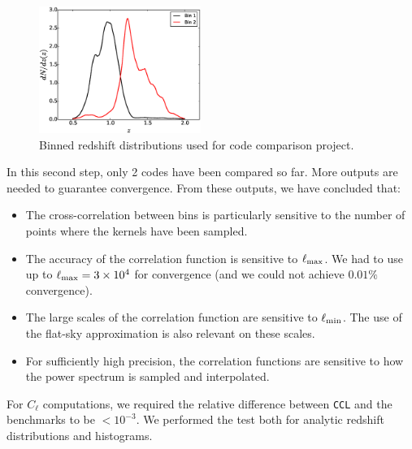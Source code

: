 \documentclass[\docopts]{\docclass}
\newcommand{\ccl}{{\tt CCL}\xspace}
\begin{document}
\begin{figure}
\centering
\includegraphics[width=0.47\textwidth]{zdist.eps}
\caption{Binned redshift distributions used for code comparison project.}
\label{fig:zhistos}
\end{figure}

In this second step, only 2 codes have been compared so far. More outputs are needed to guarantee convergence. From these outputs, we have concluded that:
\begin{itemize}
\item The cross-correlation between bins is particularly sensitive to the number of points where the kernels have been sampled.
\item The accuracy of the correlation function is sensitive to $\ell_{\rm max}$. We had to use up to $\ell_{\rm max}=3\times10^4$ for convergence (and we could not achieve $0.01\%$ convergence).
\item The large scales of the correlation function are sensitive to $\ell_{\rm min}$. The use of the flat-sky approximation is also relevant on these scales.
\item For sufficiently high precision, the correlation functions are sensitive to how the power spectrum is sampled and interpolated.
\end{itemize}

For $C_\ell$ computations, we required the relative difference between \ccl and the benchmarks to be $<10^{-3}$. We performed the test both for analytic redshift distributions and histograms.
\end{document}
